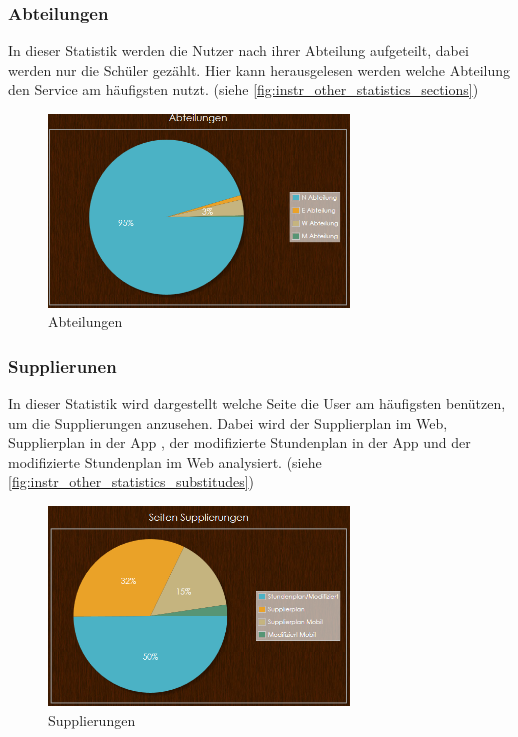 \subsubsection{Abteilungen}
In dieser Statistik werden die Nutzer nach ihrer Abteilung aufgeteilt, dabei werden nur die Schüler gezählt. Hier kann herausgelesen werden welche Abteilung den Service am häufigsten nutzt. (siehe \autoref{fig:instr_other_statistics_sections})
\begin{figure}[H]
\centering
\includegraphics[keepaspectratio=true, width=8cm]{images/screenshots/statistics_sections.png}
\caption{Abteilungen}
\label{fig:instr_other_statistics_sections}
\end{figure}
\subsubsection{Supplierunen}
In dieser Statistik wird dargestellt welche Seite die User am häufigsten benützen, um die Supplierungen anzusehen. Dabei wird der Supplierplan im Web, Supplierplan in der App , der modifizierte Stundenplan in der App und der modifizierte Stundenplan im Web analysiert. (siehe \autoref{fig:instr_other_statistics_substitudes})
\begin{figure}[H]
\centering
\includegraphics[keepaspectratio=true, width=8cm]{images/screenshots/statistics_substitudes.png}
\caption{Supplierungen}
\label{fig:instr_other_statistics_substitudes}
\end{figure}
